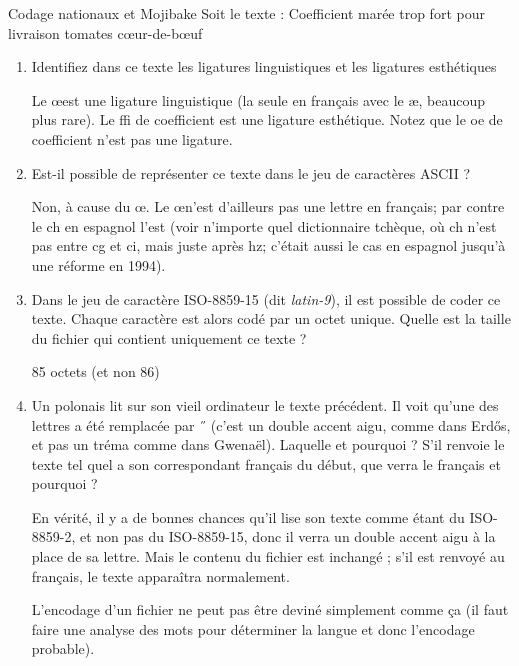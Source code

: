 \begin{exercice}
  \begin{exercicelet}{Codage nationaux et Mojibake}
    Soit le texte : \textrm{Coefficient marée trop fort pour livraison tomates
      cœur-de-bœuf}
    \begin{enumerate}
    \item Identifiez dans ce texte les ligatures linguistiques et les ligatures esthétiques
      \begin{xcorrection} Le \oe est une ligature linguistique (la seule en
        français avec le æ, beaucoup plus rare). Le ffi de coefficient est une
        ligature esthétique. Notez que le oe de coefficient n'est pas une
        ligature.
      \end{xcorrection}
    \item Est-il possible de représenter ce texte dans le jeu de caractères
      ASCII ?
      \begin{xcorrection}
        Non, à cause du \oe. Le \oe n'est d'ailleurs pas une lettre en
        français; par contre le ch en espagnol l'est (voir n'importe quel
        dictionnaire tchèque, où ch n'est pas entre cg et ci, mais juste après
        hz; c'était aussi le cas en espagnol jusqu'à une réforme en 1994).
      \end{xcorrection}
    \item Dans le jeu de caractère ISO-8859-15 (dit \emph{latin-9}), il est
      possible de coder ce texte. Chaque caractère est alors codé par un
      octet unique. Quelle est la taille du fichier qui contient uniquement
      ce texte ?\begin{correction}85 octets (et non 86)\end{correction}
    \item Un polonais lit sur son vieil ordinateur le texte précédent. Il
      voit qu'une des lettres a été remplacée par \H{~} (c'est un double
      accent aigu, comme dans Erd\H{o}s, et pas un tréma comme dans
      Gwenaël). Laquelle et pourquoi ? S'il renvoie le texte tel quel a son
      correspondant français du début, que verra le français et pourquoi ?
      \begin{xcorrection}
        En vérité, il y a de bonnes chances qu'il lise son texte comme étant
        du ISO-8859-2, et non pas du ISO-8859-15, donc il verra un double
        accent aigu à la place de sa lettre. Mais le contenu du fichier est
        inchangé ; s'il est renvoyé au français, le texte apparaîtra normalement.

        L'encodage d'un fichier ne peut pas être deviné simplement comme ça
        (il faut faire une analyse des mots pour déterminer la langue et donc
        l'encodage probable).


\end{xcorrection}
\end{enumerate}
\end{exercicelet}
\end{exercice}
